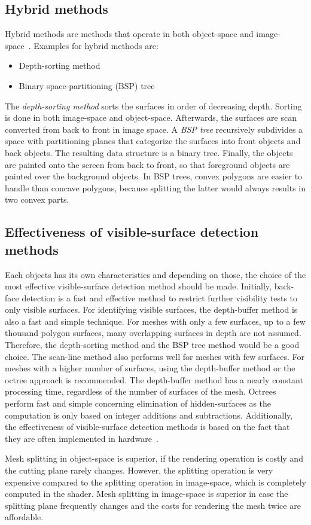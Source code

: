 \subsection{Hybrid methods}
Hybrid methods are methods that operate in both object-space and image-space~\cite{book:computerGraphicsHearn}. Examples for hybrid methods are:
\begin{itemize}
	\item Depth-sorting method
	\item Binary space-partitioning (BSP) tree
\end{itemize}

The \emph{depth-sorting method} sorts the surfaces in order of decreasing depth. Sorting is done in both image-space and object-space. Afterwards, the surfaces are scan converted from back to front in image space. A \emph{BSP tree} recursively subdivides a space with partitioning planes that categorize the surfaces into front objects and back objects. The resulting data structure is a binary tree. Finally, the objects are painted onto the screen from back to front, so that foreground objects are painted over the background objects. In BSP trees, convex polygons are easier to handle than concave polygons, because splitting the latter would always results in two convex parts.

\subsection{Effectiveness of visible-surface detection methods}
Each objects has its own characteristics and depending on those, the choice of the most effective visible-surface detection method should be made. Initially, back-face detection is a fast and effective method to restrict further visibility tests to only visible surfaces. For identifying visible surfaces, the depth-buffer method is also a fast and simple technique. For meshes with only a few surfaces, up to a few thousand polygon surfaces, many overlapping surfaces in depth are not assumed. Therefore, the depth-sorting method and the BSP tree method would be a good choice. The scan-line method also performs well for meshes with few surfaces. For meshes with a higher number of surfaces, using the depth-buffer method or the octree approach is recommended. The depth-buffer method has a nearly constant processing time, regardless of the number of surfaces of the mesh. Octrees perform fast and simple concerning elimination of hidden-surfaces as the computation is only based on integer additions and subtractions. Additionally, the effectiveness of visible-surface detection methods is based on the fact that they are often implemented in hardware~\cite{book:computerGraphicsHearn}.

Mesh splitting in object-space is superior, if the rendering operation is costly and the cutting plane rarely changes. However, the splitting operation is very expensive compared to the splitting operation in image-space, which is completely computed in the shader. Mesh splitting in image-space is superior in case the splitting plane frequently changes and the costs for rendering the mesh twice are affordable.